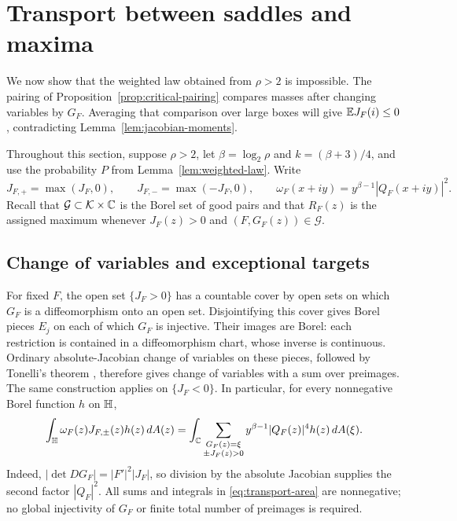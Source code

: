 \section{Transport between saddles and maxima}\label{sec:transport}

We now show that the weighted law obtained from $\rho>2$ is impossible.
The pairing of Proposition~\ref{prop:critical-pairing} compares masses
after changing variables by $G_F$.  Averaging that comparison over large
boxes will give $\mathbb E J_F(i)\leq0$, contradicting
Lemma~\ref{lem:jacobian-moments}.

Throughout this section, suppose $\rho>2$, let
$\beta=\log_2\rho$ and $k=(\beta+3)/4$, and use the probability $P$ from
Lemma~\ref{lem:weighted-law}.  Write
\[
 J_{F,+}=\max(J_F,0),\qquad J_{F,-}=\max(-J_F,0),\qquad
 \omega_F(x+iy)=y^{\beta-1}|Q_F(x+iy)|^2.
\]
Recall that $\mathcal G\subset\mathcal K\times\mathbb C$ is the Borel set of good
pairs and that $R_F(z)$ is the assigned maximum whenever
$J_F(z)>0$ and $(F,G_F(z))\in\mathcal G$.

\subsection{Change of variables and exceptional targets}

For fixed $F$, the open set $\{J_F>0\}$ has a countable cover by open
sets on which $G_F$ is a diffeomorphism onto an open set.  Disjointifying
this cover gives Borel pieces $E_j$ on each of which $G_F$ is injective.
Their images are Borel: each restriction is contained in a
diffeomorphism chart, whose inverse is continuous.  Ordinary
absolute-Jacobian change of variables on these pieces, followed by
Tonelli's theorem \cite[Theorems~2.37 and~2.47]{Folland1999},
therefore gives change of variables with a sum over
preimages.  The same construction applies on $\{J_F<0\}$.
In particular, for every nonnegative Borel function $h$ on $\mathbb H$,
\begin{equation}\label{eq:transport-area}
 \int_{\mathbb H}\omega_F(z)J_{F,\pm}(z)h(z)\,d A(z)
 =
 \int_{\mathbb C}
 \sum_{\substack{G_F(z)=\xi\\ \pm J_F(z)>0}}
 y^{\beta-1}|Q_F(z)|^4h(z)\,d A(\xi).
\end{equation}
Indeed, $|\det DG_F|=|F'|^2|J_F|$, so division by the absolute
Jacobian supplies the second factor $|Q_F|^2$.  All sums and integrals
in \eqref{eq:transport-area} are nonnegative; no global injectivity of
$G_F$ or finite total number of preimages is required.

